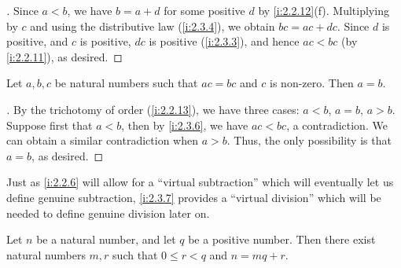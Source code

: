 \begin{proof}[]
  Since \(a < b\), we have \(b = a + d\) for some positive \(d\) by \cref{i:2.2.12}(f).
  Multiplying by \(c\) and using the distributive law (\cref{i:2.3.4}), we obtain \(bc = ac + dc\).
  Since \(d\) is positive, and \(c\) is positive, \(dc\) is positive (\cref{i:2.3.3}), and hence \(ac < bc\) (by \cref{i:2.2.11}), as desired.
\end{proof}

\begin{cor}\label{i:2.3.7}
  Let \(a, b, c\) be natural numbers such that \(ac = bc\) and \(c\) is non-zero.
  Then \(a = b\).
\end{cor}

\begin{proof}[]
  By the trichotomy of order (\cref{i:2.2.13}), we have three cases: \(a < b\), \(a = b\), \(a > b\).
  Suppose first that \(a < b\), then by \cref{i:2.3.6}, we have \(ac < bc\), a contradiction.
  We can obtain a similar contradiction when \(a > b\).
  Thus, the only possibility is that \(a = b\), as desired.
\end{proof}

\begin{rmk}\label{i:2.3.8}
  Just as \cref{i:2.2.6} will allow for a ``virtual subtraction'' which will eventually let us define genuine subtraction, \cref{i:2.3.7} provides a ``virtual division'' which will be needed to define genuine division later on.
\end{rmk}

\begin{prop}\label{i:2.3.9}
  Let \(n\) be a natural number, and let \(q\) be a positive number.
  Then there exist natural numbers \(m, r\) such that \(0 \leq r < q\) and \(n = mq + r\).
\end{prop}

